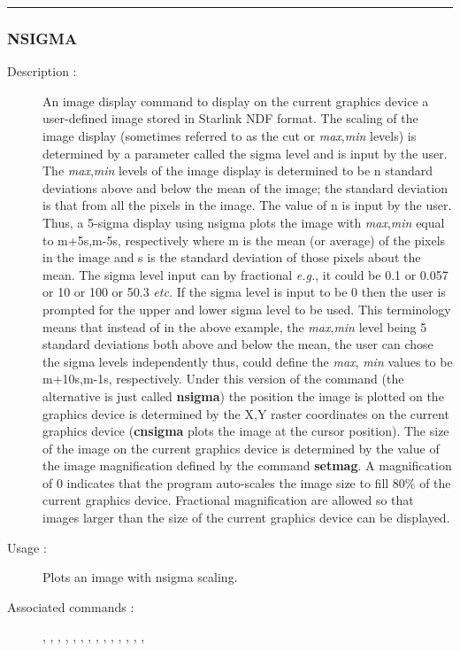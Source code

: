 \hrule
\subsubsection*{\label{NSIGMA}NSIGMA}

\begin{description}

\item[Description :] An image display command to display on the current
graphics device a user-defined image stored in Starlink NDF format.
The scaling of the image display (sometimes referred to as the cut or
{\it max},{\it min} levels) is determined by a parameter called the
sigma level and is input by the user.  The {\it max},{\it min} levels
of the image display is determined to be n standard deviations above
and below the mean of the image; the standard deviation is that from
all the pixels in the image.  The value of n is input by the user.
Thus, a 5-sigma display using nsigma plots the image with {\it
max},{\it min} equal to m+5s,m-5s, respectively where m is the mean (or
average) of the pixels in the image and s is the standard deviation of
those pixels about the mean.  The sigma level input can by fractional
\emph{e.g.}, it could be 0.1 or 0.057 or 10 or 100 or 50.3 \emph{etc.}
If the sigma level is input to be 0 then the user is prompted for the
upper and lower sigma level to be used. This terminology means that
instead of in the above example, the {\it max},{\it min} level being 5
standard deviations both above and below the mean, the user can chose
the sigma levels independently thus, could define the {\it max},{\it
min} values to be m+10s,m-1s, respectively.  Under this version of the
command (the alternative is just called {\bf nsigma}) the position the image
is plotted on the graphics device is determined by the X,Y raster
coordinates on the current graphics device ({\bf cnsigma} plots the image at
the cursor position). The size of the image on the current graphics
device is determined by the value of the image magnification defined by
the command {\bf setmag}.  A magnification of 0 indicates that the program
auto-scales the image size to fill 80\% of the current graphics device.
Fractional magnification are allowed so that images larger than the
size of the current graphics device can be displayed.

\item[Usage :] Plots an image with nsigma scaling.

\item[Associated commands :] {\tt {}},
{\tt {}}, {\tt {}},
{\tt {}}, {\tt {}},
{\tt {}}, {\tt {}},
{\tt {}}, {\tt {}},
{\tt {}}, {\tt {}},
{\tt {}}, {\tt {}},
{\tt {}}, {\tt {}}


\end{description}
